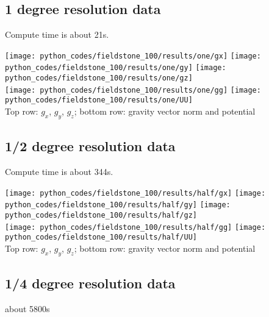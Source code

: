 \newpage
\subsection*{1 degree resolution data}

Compute time is about 21s. 

\begin{center}
\texttt{[image: python\_codes/fieldstone\_100/results/one/gx]}
\texttt{[image: python\_codes/fieldstone\_100/results/one/gy]}
\texttt{[image: python\_codes/fieldstone\_100/results/one/gz]}\\
\texttt{[image: python\_codes/fieldstone\_100/results/one/gg]}
\texttt{[image: python\_codes/fieldstone\_100/results/one/UU]}\\
{\captionfont Top row: $g_x$, $g_y$, $g_z$;
bottom row: gravity vector norm and potential}
\end{center}

\subsection*{1/2 degree resolution data}

Compute time is about 344s. 

\begin{center}
\texttt{[image: python\_codes/fieldstone\_100/results/half/gx]}
\texttt{[image: python\_codes/fieldstone\_100/results/half/gy]}
\texttt{[image: python\_codes/fieldstone\_100/results/half/gz]}\\
\texttt{[image: python\_codes/fieldstone\_100/results/half/gg]}
\texttt{[image: python\_codes/fieldstone\_100/results/half/UU]}\\
{\captionfont Top row: $g_x$, $g_y$, $g_z$;
bottom row: gravity vector norm and potential}
\end{center}

\subsection*{1/4 degree resolution data}

about 5800s



\newpage
